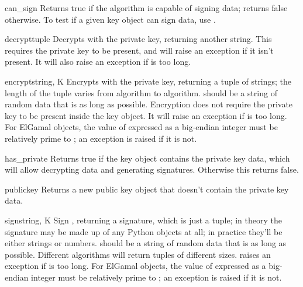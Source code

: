 \documentclass{howto}
\begin{document}
\begin{methoddesc}{can_sign}{}
Returns true if the algorithm is capable of signing data; returns false
otherwise.  To test if a given key object can sign data, use
.
\end{methoddesc}

\begin{methoddesc}{decrypt}{tuple}
Decrypts  with the private key, returning another string.
This requires the private key to be present, and will raise an exception
if it isn't present.  It will also raise an exception if  is
too long.
\end{methoddesc}

\begin{methoddesc}{encrypt}{string, K}
Encrypts  with the private key, returning a tuple of
strings; the length of the tuple varies from algorithm to algorithm.  
 should be a string of random data that is as long as
possible.  Encryption does not require the private key to be present
inside the key object.  It will raise an exception if  is
too long.  For ElGamal objects, the value of  expressed as a
big-endian integer must be relatively prime to ; an
exception is raised if it is not.
\end{methoddesc}

\begin{methoddesc}{has_private}{}
Returns true if the key object contains the private key data, which
will allow decrypting data and generating signatures.
Otherwise this returns false.
\end{methoddesc}

\begin{methoddesc}{publickey}{}
Returns a new public key object that doesn't contain the private key
data. 
\end{methoddesc}

\begin{methoddesc}{sign}{string, K}
Sign , returning a signature, which is just a tuple; in
theory the signature may be made up of any Python objects at all; in
practice they'll be either strings or numbers.   should be a
string of random data that is as long as possible.  Different algorithms
will return tuples of different sizes.   raises an
exception if  is too long.  For ElGamal objects, the value
of  expressed as a big-endian integer must be relatively prime to
; an exception is raised if it is not.
\end{methoddesc}
\end{document}

